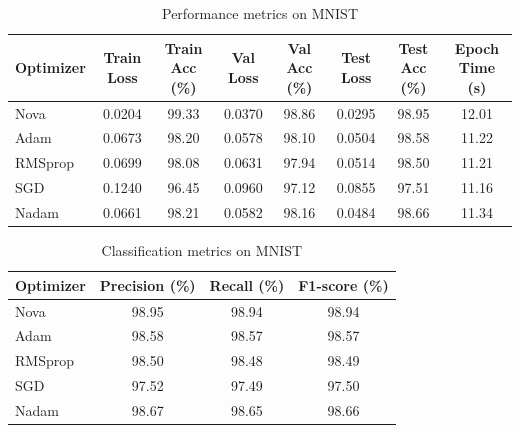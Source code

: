 \documentclass{article}
\begin{document}
\begin{table}[H]
\centering
\caption{Performance metrics on MNIST}
\begin{tabular}{lccccccc}
\toprule
Optimizer & Train Loss & Train Acc (\%) & Val Loss & Val Acc (\%) & Test Loss & Test Acc (\%) & Epoch Time (s) \\
\midrule
Nova & 0.0204 & 99.33 & 0.0370 & 98.86 & 0.0295 & 98.95&12.01 \\
Adam & 0.0673 & 98.20 & 0.0578 & 98.10 & 0.0504 & 98.58& 11.22\\
RMSprop & 0.0699 & 98.08 & 0.0631 & 97.94 & 0.0514 & 98.50& 11.21 \\
SGD & 0.1240 & 96.45 & 0.0960 & 97.12 & 0.0855 & 97.51& 11.16 \\
Nadam & 0.0661 & 98.21 & 0.0582 & 98.16 & 0.0484 & 98.66&  11.34\\
\bottomrule
\end{tabular}
\label{tab:mnist_main}
\end{table}





\begin{table}[H]
\centering
\caption{Classification metrics on MNIST}
\begin{tabular}{lccc}
\toprule
Optimizer & Precision (\%) & Recall (\%) & F1-score (\%) \\
\midrule
Nova & 98.95 & 98.94 & 98.94 \\
Adam & 98.58 & 98.57 & 98.57 \\
RMSprop & 98.50 & 98.48 & 98.49 \\
SGD & 97.52 & 97.49 & 97.50 \\
Nadam & 98.67 & 98.65 & 98.66 \\
\bottomrule
\end{tabular}
\label{tab:mnist_prf}
\end{table}
\end{document}
